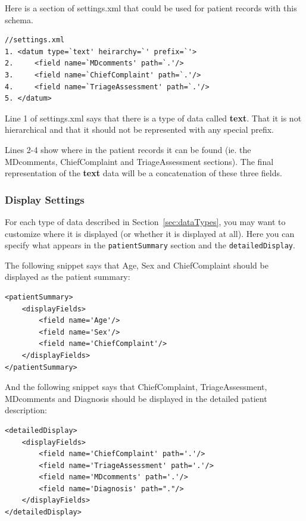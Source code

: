 \documentclass[12pt]{article}
\begin{document}
Here is a section of settings.xml that could be used for patient records with this schema.

\begin{verbatim}
//settings.xml
1. <datum type=`text' heirarchy=`' prefix=`'>
2.     <field name=`MDcomments' path=`.'/>
3.     <field name=`ChiefComplaint' path=`.'/>
4.     <field name=`TriageAssessment' path=`.'/>
5. </datum>
\end{verbatim}

Line 1 of settings.xml says that there is a type of data called {\bf text}. That it is not hierarchical and that it should not be represented with any special prefix.

Lines 2-4 show where in the patient records it can be found (ie. the MDcomments, ChiefComplaint and TriageAssessment sections). The final representation of the {\bf text} data will be a concatenation of these three fields.


\subsubsection{Display Settings}
\label{sec:display_settings}
For each type of data described in Section~\ref{sec:dataTypes}, you may want to customize where it is displayed (or whether it is displayed at all). Here you can specify what appears in the {\tt patientSummary} section and the {\tt detailedDisplay}. 

The following snippet says that Age, Sex and ChiefComplaint should be displayed as the patient summary:
\begin{verbatim}
<patientSummary>
    <displayFields>
        <field name='Age'/>
        <field name='Sex'/>
        <field name='ChiefComplaint'/>
    </displayFields>
</patientSummary>
\end{verbatim}

And the following snippet says that ChiefComplaint, TriageAssessment, MDcomments and Diagnosis should be displayed in the detailed patient description:

\begin{verbatim}
<detailedDisplay>
    <displayFields>
        <field name='ChiefComplaint' path='.'/>
        <field name='TriageAssessment' path='.'/>
        <field name='MDcomments' path='.'/>
        <field name='Diagnosis' path="."/>
    </displayFields>
</detailedDisplay>
\end{verbatim}
\end{document}
